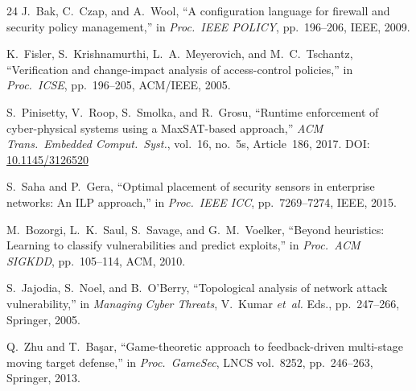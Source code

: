 \documentclass[journal]{IEEEtran}
\newcommand{\etal}{\emph{et~al.}}
\begin{document}
\begin{thebibliography}{24}
J.~Bak, C.~Czap, and A.~Wool,
``A configuration language for firewall and security policy
management,'' in \textit{Proc.\ IEEE POLICY},
pp.~196--206, IEEE, 2009.

K.~Fisler, S.~Krishnamurthi, L.~A.~Meyerovich, and
M.~C.~Tschantz,
``Verification and change-impact analysis of access-control
policies,'' in \textit{Proc.\ ICSE},
pp.~196--205, ACM/IEEE, 2005.

S.~Pinisetty, V.~Roop, S.~Smolka, and R.~Grosu,
``Runtime enforcement of cyber-physical systems using a
MaxSAT-based approach,''
\textit{ACM Trans.\ Embedded Comput.\ Syst.}, vol.~16,
no.~5s, Article~186, 2017.
DOI: \href{https://doi.org/10.1145/3126520}{10.1145/3126520}

S.~Saha and P.~Gera,
``Optimal placement of security sensors in enterprise
networks: An ILP approach,''
in \textit{Proc.\ IEEE ICC}, pp.~7269--7274, IEEE, 2015.

M.~Bozorgi, L.~K.~Saul, S.~Savage, and G.~M.~Voelker,
``Beyond heuristics: Learning to classify vulnerabilities
and predict exploits,''
in \textit{Proc.\ ACM SIGKDD}, pp.~105--114, ACM, 2010.


S.~Jajodia, S.~Noel, and B.~O'Berry,
``Topological analysis of network attack vulnerability,''
in \textit{Managing Cyber Threats}, V.~Kumar \etal{} Eds.,
pp.~247--266, Springer, 2005.

Q.~Zhu and T.~Ba\c{s}ar,
``Game-theoretic approach to feedback-driven multi-stage
moving target defense,''
in \textit{Proc.\ GameSec}, LNCS vol.~8252,
pp.~246--263, Springer, 2013.

\end{thebibliography}
\end{document}
